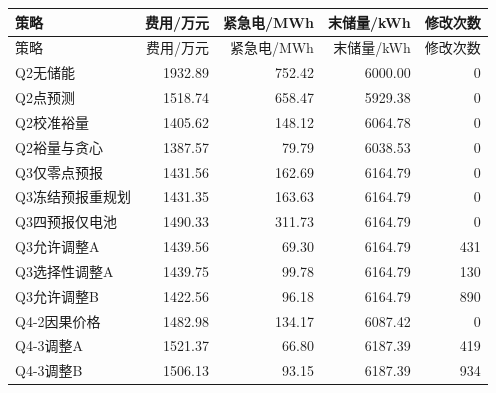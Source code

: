 \small\begin{longtable}{lrrrr}\toprule 策略 & 费用/万元 & 紧急电/MWh & 末储量/kWh & 修改次数\\\midrule\endfirsthead
\toprule 策略 & 费用/万元 & 紧急电/MWh & 末储量/kWh & 修改次数\\\midrule\endhead
Q2无储能 & 1932.89 & 752.42 & 6000.00 & 0\\
Q2点预测 & 1518.74 & 658.47 & 5929.38 & 0\\
Q2校准裕量 & 1405.62 & 148.12 & 6064.78 & 0\\
Q2裕量与贪心 & 1387.57 & 79.79 & 6038.53 & 0\\
Q3仅零点预报 & 1431.56 & 162.69 & 6164.79 & 0\\
Q3冻结预报重规划 & 1431.35 & 163.63 & 6164.79 & 0\\
Q3四预报仅电池 & 1490.33 & 311.73 & 6164.79 & 0\\
Q3允许调整A & 1439.56 & 69.30 & 6164.79 & 431\\
Q3选择性调整A & 1439.75 & 99.78 & 6164.79 & 130\\
Q3允许调整B & 1422.56 & 96.18 & 6164.79 & 890\\
Q4-2因果价格 & 1482.98 & 134.17 & 6087.42 & 0\\
Q4-3调整A & 1521.37 & 66.80 & 6187.39 & 419\\
Q4-3调整B & 1506.13 & 93.15 & 6187.39 & 934\\
\bottomrule\end{longtable}
